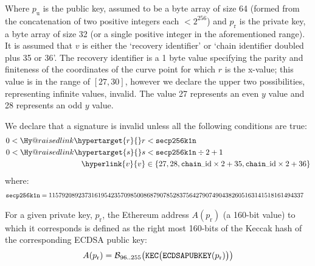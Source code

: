 \documentclass[9pt,oneside]{amsart}
\makeatletter
\newcommand{\linkdest}[1]{\Hy@raisedlink{\hypertarget{#1}{}}}
\makeatother
\begin{document}
Where $p_{\mathrm{u}}$ is the public key, assumed to be a byte array of size 64 (formed from the concatenation of two positive integers each $< 2^{256}$) and $p_{\mathrm{r}}$ is the private key, a byte array of size 32 (or a single positive integer in the aforementioned range). It is assumed that \hypertarget{v}{}$v$ is either the `recovery identifier' or `chain identifier doubled plus 35 or 36'. The recovery identifier is a 1 byte value specifying the parity and finiteness of the coordinates of the curve point for which $r$ is the x-value; this value is in the range of $[27, 30]$, however we declare the upper two possibilities, representing infinite values, invalid. The value 27 represents an even $y$ value and 28 represents an odd $y$ value.

\newcommand{\slimit}{\ensuremath{\text{s-limit}}}

We declare that a signature is invalid unless all the following conditions are true:
\begin{align}
0 < \linkdest{r}{r} &< \mathtt{\tiny secp256k1n} \\
0 < \linkdest{s}{s} &< \mathtt{\tiny secp256k1n} \div 2 + 1 \\
\hyperlink{v}{v} &\in \{27,28,\mathtt{\tiny chain\_{\mathrm{id}}} \times 2 + 35, \mathtt{\tiny chain\_{\mathrm{id}}} \times 2 + 36\}
\end{align}
where:
\begin{align}
\mathtt{\tiny secp256k1n} &= 115792089237316195423570985008687907852837564279074904382605163141518161494337
\end{align}

For a given private key, $p_{\mathrm{r}}$, the Ethereum address $A(p_{\mathrm{r}})$ (a 160-bit value) to which it corresponds is defined as the right most 160-bits of the Keccak hash of the corresponding ECDSA public key:
\begin{equation}
A(p_{\mathrm{r}}) = \mathcal{B}_{96..255}\big(\mathtt{\tiny KEC}\big( \mathtt{\small ECDSAPUBKEY}(p_{\mathrm{r}}) \big) \big)
\end{equation}
\end{document}
